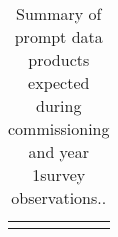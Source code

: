 \begin{table}
{\begin{tabular}{|p{0.31\linewidth} | p{0.32\linewidth}  | p{0.32\linewidth}|}
\arrayrulecolor{black}\hline
\end{tabular}}
\caption{Summary of prompt data products expected during commissioning and year 1survey observations..}
\label{tab:prompt-data-products}
\end{table}
